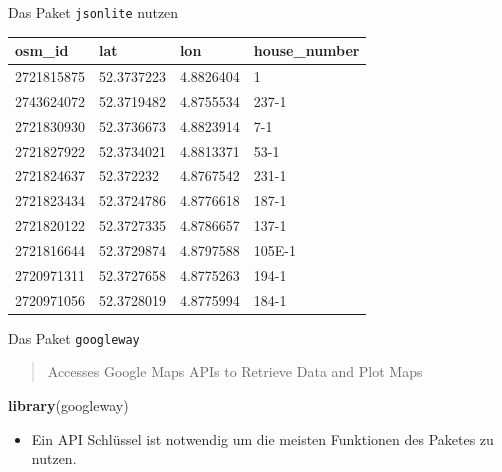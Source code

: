 \documentclass[ignorenonframetext,]{beamer}
\newenvironment{Shaded}{\begin{snugshade}}{\end{snugshade}}
\newcommand{\DataTypeTok}[1]{\textcolor[rgb]{0.74,0.68,0.62}{\underline{#1}}}
\newcommand{\KeywordTok}[1]{\textcolor[rgb]{0.26,0.66,0.93}{\textbf{#1}}}
\newcommand{\NormalTok}[1]{\textcolor[rgb]{0.74,0.68,0.62}{#1}}
\newcommand{\OperatorTok}[1]{\textcolor[rgb]{0.74,0.68,0.62}{#1}}
\newcommand{\StringTok}[1]{\textcolor[rgb]{0.02,0.61,0.04}{#1}}
\providecommand{\tightlist}{%
  \setlength{\itemsep}{0pt}\setlength{\parskip}{0pt}}
\begin{document}
\begin{frame}[fragile]{Das Paket \texttt{jsonlite} nutzen}
\protect\hypertarget{das-paket-jsonlite-nutzen}{}

\begin{Shaded}
\end{Shaded}

\begin{longtable}[]{@{}llll@{}}
\toprule
osm\_id & lat & lon & house\_number\tabularnewline
\midrule
\endhead
2721815875 & 52.3737223 & 4.8826404 & 1\tabularnewline
2743624072 & 52.3719482 & 4.8755534 & 237-1\tabularnewline
2721830930 & 52.3736673 & 4.8823914 & 7-1\tabularnewline
2721827922 & 52.3734021 & 4.8813371 & 53-1\tabularnewline
2721824637 & 52.372232 & 4.8767542 & 231-1\tabularnewline
2721823434 & 52.3724786 & 4.8776618 & 187-1\tabularnewline
2721820122 & 52.3727335 & 4.8786657 & 137-1\tabularnewline
2721816644 & 52.3729874 & 4.8797588 & 105E-1\tabularnewline
2720971311 & 52.3727658 & 4.8775263 & 194-1\tabularnewline
2720971056 & 52.3728019 & 4.8775994 & 184-1\tabularnewline
\bottomrule
\end{longtable}

\end{frame}

\begin{frame}[fragile]{Das Paket \texttt{googleway}}
\protect\hypertarget{das-paket-googleway}{}

\begin{quote}
Accesses Google Maps APIs to Retrieve Data and Plot Maps
\end{quote}

\begin{Shaded}
\begin{Highlighting}[]
\KeywordTok{library}\NormalTok{(googleway)}
\end{Highlighting}
\end{Shaded}

\begin{itemize}
\tightlist
\item
  Ein API Schlüssel ist notwendig um die meisten Funktionen des Paketes
  zu nutzen.
\end{itemize}

\end{frame}
\end{document}
